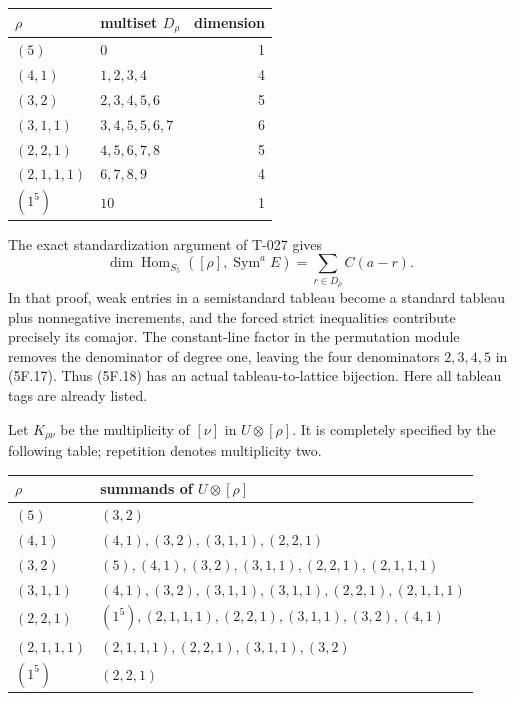 \documentclass[
  10pt,
]{article}
\begin{document}
\begin{longtable}[]{@{}llr@{}}
\toprule\noalign{}
\(\rho\) & multiset \(D_\rho\) & dimension \\
\midrule\noalign{}
\endhead
\bottomrule\noalign{}
\endlastfoot
\((5)\) & \(0\) & 1 \\
\((4,1)\) & \(1,2,3,4\) & 4 \\
\((3,2)\) & \(2,3,4,5,6\) & 5 \\
\((3,1,1)\) & \(3,4,5,5,6,7\) & 6 \\
\((2,2,1)\) & \(4,5,6,7,8\) & 5 \\
\((2,1,1,1)\) & \(6,7,8,9\) & 4 \\
\((1^5)\) & \(10\) & 1 \\
\end{longtable}

The exact standardization argument of T-027 gives \[
\dim\operatorname{Hom}_{S_5}([\rho],\operatorname{Sym}^aE)
=\sum_{r\in D_\rho}C(a-r).
\tag{5F.18}
\] In that proof, weak entries in a semistandard tableau become a
standard tableau plus nonnegative increments, and the forced strict
inequalities contribute precisely its comajor. The constant-line factor
in the permutation module removes the denominator of degree one, leaving
the four denominators \(2,3,4,5\) in (5F.17). Thus (5F.18) has an actual
tableau-to-lattice bijection. Here all tableau tags are already listed.

Let \(K_{\rho\nu}\) be the multiplicity of \([\nu]\) in
\(U\otimes[\rho]\). It is completely specified by the following table;
repetition denotes multiplicity two.

\begin{longtable}[]{@{}ll@{}}
\toprule\noalign{}
\(\rho\) & summands of \(U\otimes[\rho]\) \\
\midrule\noalign{}
\endhead
\bottomrule\noalign{}
\endlastfoot
\((5)\) & \((3,2)\) \\
\((4,1)\) & \((4,1),(3,2),(3,1,1),(2,2,1)\) \\
\((3,2)\) & \((5),(4,1),(3,2),(3,1,1),(2,2,1),(2,1,1,1)\) \\
\((3,1,1)\) & \((4,1),(3,2),(3,1,1),(3,1,1),(2,2,1),(2,1,1,1)\) \\
\((2,2,1)\) & \((1^5),(2,1,1,1),(2,2,1),(3,1,1),(3,2),(4,1)\) \\
\((2,1,1,1)\) & \((2,1,1,1),(2,2,1),(3,1,1),(3,2)\) \\
\((1^5)\) & \((2,2,1)\) \\
\end{longtable}
\end{document}
